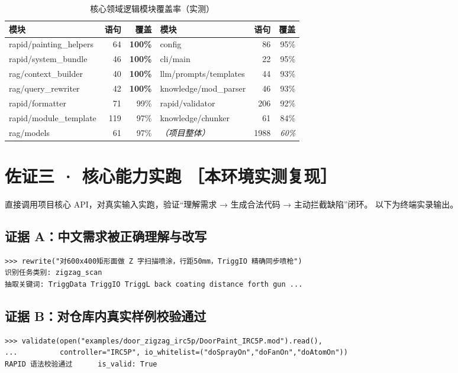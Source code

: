 \documentclass[11pt,a4paper,fontset=none]{ctexart}
\begin{document}
\begin{table}[h]
\centering
\caption{核心领域逻辑模块覆盖率（实测）}
\small
\begin{tabularx}{\textwidth}{@{}X r r | X r r@{}}
\toprule
\textbf{模块} & \textbf{语句} & \textbf{覆盖} & \textbf{模块} & \textbf{语句} & \textbf{覆盖} \\
\midrule
rapid/painting\_helpers & 64  & \textbf{100\%} & config            & 86  & 95\% \\
rapid/system\_bundle    & 46  & \textbf{100\%} & cli/main          & 22  & 95\% \\
rag/context\_builder    & 40  & \textbf{100\%} & llm/prompts/templates & 44 & 93\% \\
rag/query\_rewriter     & 42  & \textbf{100\%} & knowledge/mod\_parser & 46 & 93\% \\
rapid/formatter         & 71  & 99\%           & rapid/validator   & 206 & 92\% \\
rapid/module\_template  & 119 & 97\%           & knowledge/chunker & 61  & 84\% \\
rag/models              & 61  & 97\%           & \textit{（项目整体）} & 1988 & \textit{60\%} \\
\bottomrule
\end{tabularx}
\end{table}

\section{佐证三 · 核心能力实跑 \normalfont\small［本环境实测复现］}

直接调用项目核心 API，对真实输入实跑，验证“理解需求 → 生成合法代码 → 主动拦截缺陷”闭环。
以下为终端实录输出。

\subsection{证据 A：中文需求被正确理解与改写}
\begin{lstlisting}[style=console]
>>> rewrite("对600x400矩形面做 Z 字扫描喷涂，行距50mm，TriggIO 精确同步喷枪")
识别任务类别: zigzag_scan
抽取关键词: TriggData TriggIO TriggL back coating distance forth gun ...
\end{lstlisting}

\subsection{证据 B：对仓库内真实样例校验通过}
\begin{lstlisting}[style=console]
>>> validate(open("examples/door_zigzag_irc5p/DoorPaint_IRC5P.mod").read(),
...          controller="IRC5P", io_whitelist=("doSprayOn","doFanOn","doAtomOn"))
RAPID 语法校验通过      is_valid: True
\end{lstlisting}
\end{document}
